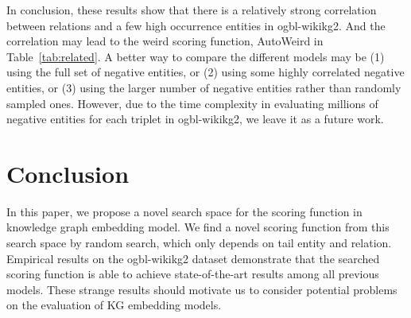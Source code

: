 \documentclass{article}
\begin{document}
In conclusion, these results show that
there is a relatively strong correlation between relations and a few high occurrence entities in ogbl-wikikg2.
And the correlation may lead to the weird scoring function, AutoWeird in Table~\ref{tab:related}.
A better way to compare the different models
may be 
(1) using the full set of negative entities,
or (2) using some highly correlated negative entities,
or (3) using the larger number of negative entities
rather than  randomly sampled ones.
However,
due to the time complexity in evaluating millions of negative entities for each triplet in ogbl-wikikg2, 
we leave it as a future work.


\section{Conclusion}
In this paper, we propose a novel search space for the scoring function in knowledge graph embedding model. 
We find a novel scoring function from this search space by random search, which only depends on tail entity and relation. 
Empirical results on the ogbl-wikikg2 dataset demonstrate that the searched scoring function is able to achieve state-of-the-art results among all previous models. 
These strange results should motivate us to consider potential problems 
on the evaluation of KG embedding models. 



\end{document}
